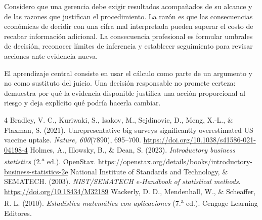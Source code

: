 \documentclass[
	spanish,
	letterpaper, oneside
]{article}
\begin{document}
Considero que una gerencia debe exigir resultados acompañados de su alcance y de las razones que justifican el procedimiento. La razón es que las consecuencias económicas de decidir con una cifra mal interpretada pueden superar el costo de recabar información adicional. La consecuencia profesional es formular umbrales de decisión, reconocer límites de inferencia y establecer seguimiento para revisar acciones ante evidencia nueva.

El aprendizaje central consiste en usar el cálculo como parte de un argumento y no como sustituto del juicio. Una decisión responsable no promete certeza: demuestra por qué la evidencia disponible justifica una acción proporcional al riesgo y deja explícito qué podría hacerla cambiar.
\clearpage
\renewcommand{\bibsection}{\section*{Referencias}}
\setlength{\bibhang}{1.27cm}\setlength{\bibsep}{10pt}
\begin{thebibliography}{4}
Bradley, V. C., Kuriwaki, S., Isakov, M., Sejdinovic, D., Meng, X.-L., \& Flaxman, S. (2021). Unrepresentative big surveys significantly overestimated US vaccine uptake. \textit{Nature, 600}(7890), 695--700. \url{https://doi.org/10.1038/s41586-021-04198-4}
Holmes, A., Illowsky, B., \& Dean, S. (2023). \textit{Introductory business statistics} (2.\textsuperscript{a} ed.). OpenStax. \url{https://openstax.org/details/books/introductory-business-statistics-2e}
National Institute of Standards and Technology, \& SEMATECH. (2003). \textit{NIST/SEMATECH e-Handbook of statistical methods}. \url{https://doi.org/10.18434/M32189}
Wackerly, D. D., Mendenhall, W., \& Scheaffer, R. L. (2010). \textit{Estadística matemática con aplicaciones} (7.\textsuperscript{a} ed.). Cengage Learning Editores.
\end{thebibliography}
\end{document}

